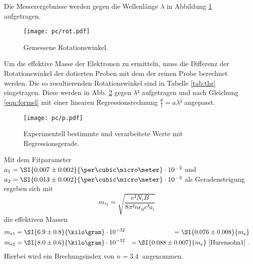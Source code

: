 Die Messerergebnisse werden gegen die Wellenlänge $\lambda$ in Abbildung \ref{fig:rot} aufgetragen.
\begin{figure}
	\centering
	\texttt{[image: pc/rot.pdf]}
	\caption{Gemessene Rotationswinkel.}
	\label{fig:rot}
\end{figure}
Um die effektive Masse der Elektronen zu ermitteln, muss die Differenz der Rotationswinkel der dotierten Proben mit dem der reinen Probe berechnet werden. Die so resultierenden Rotationswinkel sind in Tabelle \ref{tab:thr} eingetragen.
Diese werden in Abb. \ref{fig:p} gegen $\lambda²$ aufgetragen und nach Gleichung \eqref{eqn:formel} mit einer linearen Regressionsrechnung $\frac{\theta}{l} = a\lambda²$ angepasst.
\begin{figure}
	\centering
	\texttt{[image: pc/p.pdf]}
	\caption{Experimentell bestimmte und verarbeitete Werte mit Regressionsgerade.}
	\label{fig:p}
\end{figure}
Mit dem Fitparameter $a_1 = \SI{0.007\pm0.002}{\per\cubic\micro\meter}\cdot 10^{-3}$ und $a_2 = \SI{0.013\pm0.002}{\per\cubic\micro\meter}\cdot10^{-3}$ als Geradensteigung ergeben sich mit
\begin{equation}
	m_{*i} = \sqrt{\frac{e³N_i B}{8\pi² n \epsilon_0 c³ a_i}}
\end{equation}
die effektiven Massen
\begin{align}
	m_{*1} &= \SI{6.9\pm0.8}{\kilo\gram}\cdot10^{-32} &= \SI{0.076\pm0.008}{m_e}\\
	m_{*2} &= \SI{8.0\pm0.6}{\kilo\gram}\cdot10^{-32} &= \SI{0.088\pm0.007}{m_e}\text{ \cite{Hurensohn1} .}
\end{align}
Hierbei wird ein Brechungsindex von $n=\SI{3.4}{}$ \cite{Hurensohn2} angenommen.


